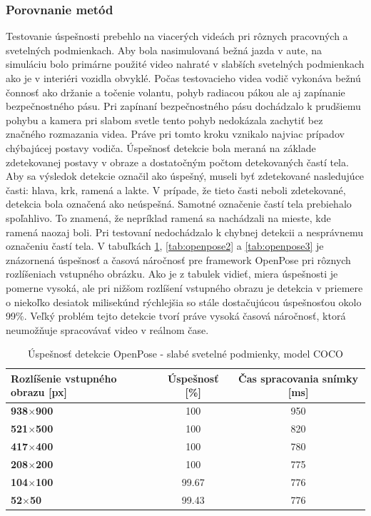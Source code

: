 \documentclass[slovak,master,dept460,male,cpp,cpdeclaration]{diploma}
\begin{document}
\subsubsection*{Porovnanie metód}
\label{sec:compare}
Testovanie úspešnosti  prebehlo na viacerých videách pri rôznych  pracovných a svetelných  podmienkach. Aby bola nasimulovaná bežná  jazda v aute, na simuláciu bolo primárne použité video nahraté v slabších  svetelných podmienkach ako je v interiéri vozidla obvyklé. Počas testovacieho videa  vodič vykonáva bežnú čonnosť ako držanie a točenie volantu, pohyb radiacou pákou ale aj zapínanie  bezpečnostného pásu. Pri zapínaní bezpečnostného pásu dochádzalo k prudšiemu pohybu a  kamera pri slabom svetle tento pohyb nedokázala  zachytiť bez  značného rozmazania videa. Práve pri tomto  kroku vznikalo najviac  prípadov chýbajúcej postavy vodiča. Úspešnosť detekcie bola meraná na základe zdetekovanej postavy v obraze a dostatočným počtom detekovaných častí tela. Aby sa výsledok detekcie označil ako úspešný, museli byť zdetekované nasledujúce časti: hlava, krk, ramená a lakte. V prípade, že tieto časti neboli zdetekované,  detekcia bola označená ako  neúspešná. Samotné označenie  častí tela prebiehalo spoľahlivo. To znamená, že nepríklad ramená sa nachádzali na mieste, kde ramená naozaj boli. Pri testovaní nedochádzalo k chybnej  detekcii a nesprávnemu označeniu častí tela. V  tabuľkách \ref{tab:openpose1}, \ref{tab:openpose2} a \ref{tab:openpose3} je znázornená úspešnosť a časová náročnosť pre framework OpenPose pri rôznych rozlíšeniach vstupného obrázku. Ako je z tabulek vidieť, miera úspešnosti je pomerne vysoká, ale pri nižšom rozlíšení vstupného obrazu je detekcia v priemere o niekoľko desiatok milisekúnd  rýchlejšia  so stále dostačujúcou úspešnosťou okolo 99\%. Veľký problém tejto detekcie tvorí práve vysoká časová náročnosť, ktorá  neumožňuje spracovávať video v reálnom čase.

\begin{table}[H]
\begin{tabular}{|l|c|c|}
\hline
\textbf{Rozlíšenie vstupného obrazu [px]}        & \textbf{Úspešnosť [\%]}  & \textbf{Čas spracovania snímky [ms]} \\ \hline
\textbf{938$\times$900}      &   100           &   950        \\ \hline
\textbf{521$\times$500}      &   100           &   820        \\ \hline
\textbf{417$\times$400}      &   100           &   780        \\ \hline
\textbf{208$\times$200}      &   100           &   775        \\ \hline
\textbf{104$\times$100}      &   99.67         &   776        \\ \hline
\textbf{52$\times$50}       &   99.43          &   776        \\ \hline
\end{tabular}

	\caption{Úspešnosť detekcie OpenPose - slabé svetelné podmienky,  model COCO}
	\label{tab:openpose1}
\end{table}
\end{document}
